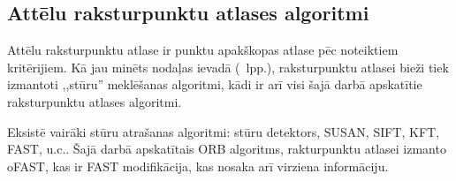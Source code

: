 \subsection{Attēlu raksturpunktu atlases algoritmi} \label{sec:corners}
Attēlu raksturpunktu atlase ir punktu apakškopas atlase pēc noteiktiem
kritērijiem. Kā jau minēts nodaļas ievadā (\pageref{sec:algo}~lpp.),
raksturpunktu atlasei bieži tiek izmantoti ,,stūru'' meklēšanas algoritmi,
kādi ir arī visi šajā darbā apskatītie raksturpunktu atlases algoritmi.


Eksistē vairāki stūru atrašanas algoritmi:  stūru detektors,
SUSAN, SIFT, KFT, FAST, u.c.. 
Šajā darbā apskatītais ORB algoritms, rakturpunktu atlasei izmanto oFAST, kas
ir FAST modifikācija, kas nosaka arī virziena informāciju.
